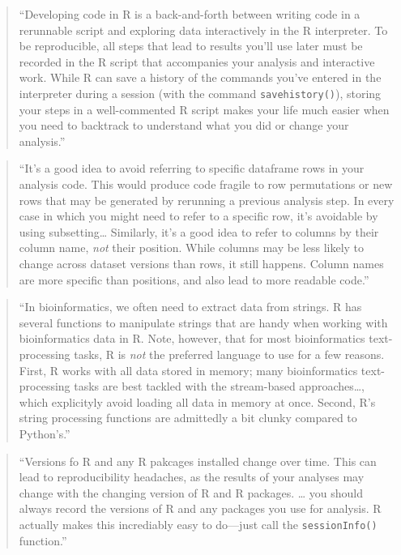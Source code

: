 \documentclass[]{tufte-book}
\begin{document}
\begin{quote}
``Developing code in R is a back-and-forth between writing code in a rerunnable script
and exploring data interactively in the R interpreter. To be reproducible, all steps
that lead to results you'll use later must be recorded in the R script that accompanies
your analysis and interactive work. While R can save a history of the commands you've
entered in the interpreter during a session (with the command \texttt{savehistory()}),
storing your steps in a well-commented R script makes your life much easier when you
need to backtrack to understand what you did or change your analysis.'' \citep{buffalo2015bioinformatics}
\end{quote}

\begin{quote}
``It's a good idea to avoid referring to specific dataframe rows in your analysis code.
This would produce code fragile to row permutations or new rows that may be generated
by rerunning a previous analysis step. In every case in which you might need to refer
to a specific row, it's avoidable by using subsetting\ldots{} Similarly, it's a good idea
to refer to columns by their column name, \emph{not} their position. While columns may be
less likely to change across dataset versions than rows, it still happens. Column names
are more specific than positions, and also lead to more readable code.''
\citep{buffalo2015bioinformatics}
\end{quote}

\begin{quote}
``In bioinformatics, we often need to extract data from strings. R has several
functions to manipulate strings that are handy when working with bioinformatics data in
R. Note, however, that for most bioinformatics text-processing tasks, R is \emph{not}
the preferred language to use for a few reasons. First, R works with all data stored
in memory; many bioinformatics text-processing tasks are best tackled with the
stream-based approaches\ldots, which explicityly avoid loading all data in memory at
once. Second, R's string processing functions are admittedly a bit clunky compared
to Python's.'' \citep{buffalo2015bioinformatics}
\end{quote}

\begin{quote}
``Versions fo R and any R pakcages installed change over time. This can lead to
reproducibility headaches, as the results of your analyses may change with the
changing version of R and R packages. \ldots{} you should always record the versions
of R and any packages you use for analysis. R actually makes this incrediably
easy to do---just call the \texttt{sessionInfo()} function.'' \citep{buffalo2015bioinformatics}
\end{quote}
\end{document}
